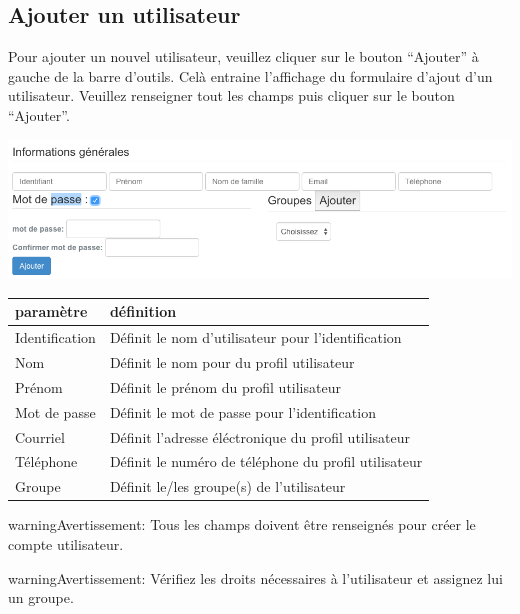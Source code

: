 \documentclass[letterpaper,10pt,french]{sphinxmanual}
\begin{document}
\subsection{Ajouter un utilisateur}
\label{dashboard/usersmanagement:ajouter-un-utilisateur}
Pour ajouter un nouvel utilisateur, veuillez cliquer sur le bouton
``Ajouter'' à gauche de la barre d'outils. Celà entraine l'affichage du
formulaire d'ajout d'un utilisateur. Veuillez renseigner tout les champs
puis cliquer sur le bouton ``Ajouter''.

\includegraphics[width=1.000\linewidth]{dashboard-adduser-form.png}

\begin{tabulary}{\linewidth}{|L|L|}
\hline

\textbf{paramètre}
 & 
\textbf{définition}
\\
\hline
Identification
 & 
Définit le nom d'utilisateur pour l'identification
\\
\hline
Nom
 & 
Définit le nom pour du profil utilisateur
\\
\hline
Prénom
 & 
Définit le prénom du profil utilisateur
\\
\hline
Mot de passe
 & 
Définit le mot de passe pour l'identification
\\
\hline
Courriel
 & 
Définit l'adresse éléctronique du profil utilisateur
\\
\hline
Téléphone
 & 
Définit le numéro de téléphone du profil utilisateur
\\
\hline
Groupe
 & 
Définit le/les groupe(s) de l'utilisateur
\\
\hline\end{tabulary}


\begin{notice}{warning}{Avertissement:}
Tous les champs doivent être renseignés pour créer le compte utilisateur.
\end{notice}

\begin{notice}{warning}{Avertissement:}
Vérifiez les droits nécessaires à l'utilisateur et assignez lui un groupe.
\end{notice}
\end{document}
